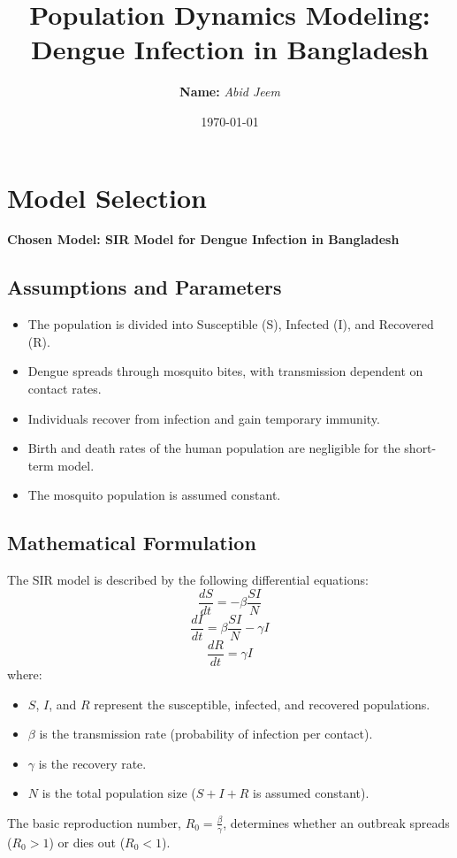 \documentclass {article}
\title{Population Dynamics Modeling: Dengue Infection in Bangladesh}
\author{\textbf{Name:} \textit{Abid Jeem}}
\date{\today}
\begin{document}
\maketitle

\section*{Model Selection}
\textbf{Chosen Model: SIR Model for Dengue Infection in Bangladesh}

\subsection*{Assumptions and Parameters}
\begin{itemize}
    \item The population is divided into Susceptible (S), Infected (I), and Recovered (R).
    \item Dengue spreads through mosquito bites, with transmission dependent on contact rates.
    \item Individuals recover from infection and gain temporary immunity.
    \item Birth and death rates of the human population are negligible for the short-term model.
    \item The mosquito population is assumed constant.
\end{itemize}

\subsection*{Mathematical Formulation}
The SIR model is described by the following differential equations:
\begin{equation}
\frac{dS}{dt} = -\beta \frac{S I}{N}
\end{equation}
\begin{equation}
\frac{dI}{dt} = \beta \frac{S I}{N} - \gamma I
\end{equation}
\begin{equation}
\frac{dR}{dt} = \gamma I
\end{equation}
where:
\begin{itemize}
    \item $S$, $I$, and $R$ represent the susceptible, infected, and recovered populations.
    \item $\beta$ is the transmission rate (probability of infection per contact).
    \item $\gamma$ is the recovery rate.
    \item $N$ is the total population size ($S + I + R$ is assumed constant).
\end{itemize}
The basic reproduction number, $R_0 = \frac{\beta}{\gamma}$, determines whether an outbreak spreads ($R_0 > 1$) or dies out ($R_0 < 1$).
\end{document}
